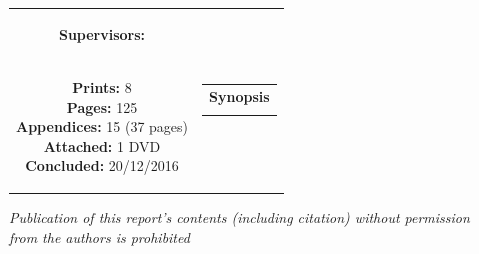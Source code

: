 \begin{nopagebreak}
{\begin{tabular}{cc}
{{\textbf{Supervisors:}\\
}\\

\textbf{Prints:} 8\\
\textbf{Pages:} 125\\
\textbf{Appendices:} 15 (37 pages)\\
\textbf{Attached:} 1 DVD\\
\textbf{Concluded:} 20/12/2016\\

\vfill } &
\parbox{7cm}{
  \vspace{.15cm}
  \hfill
  \begin{tabular}{l}
  {\textbf{Synopsis}}\bigskip \\
  \fbox{
    \parbox{6.5cm}{\bigskip
     {\vfill{\small 
     \bigskip}}
     }}
   \end{tabular}}
\end{tabular} %
}


\textit{\phantom{A}Publication of this report's contents (including citation) without permission\\ \phantom{A}from the authors is prohibited}\\

\end{nopagebreak}
%